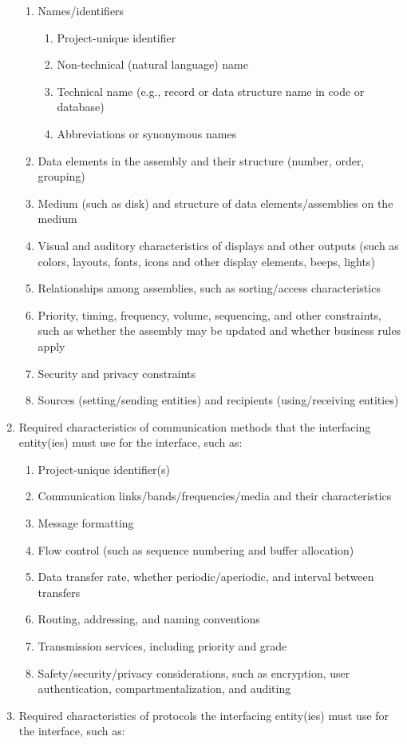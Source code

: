 \begin{enumerate}
  \begin{enumerate}
  \itemsep1pt\parskip0pt
  \item
    Names/identifiers

    \begin{enumerate}
    \itemsep1pt\parskip0pt
    \item
      Project-unique identifier
    \item
      Non-technical (natural language) name
    \item
      Technical name (e.g., record or data structure name in code or
      database)
    \item
      Abbreviations or synonymous names
    \end{enumerate}
  \item
    Data elements in the assembly and their structure (number, order,
    grouping)
  \item
    Medium (such as disk) and structure of data elements/assemblies on
    the medium
  \item
    Visual and auditory characteristics of displays and other outputs
    (such as colors, layouts, fonts, icons and other display elements,
    beeps, lights)
  \item
    Relationships among assemblies, such as sorting/access
    characteristics
  \item
    Priority, timing, frequency, volume, sequencing, and other
    constraints, such as whether the assembly may be updated and whether
    business rules apply
  \item
    Security and privacy constraints
  \item
    Sources (setting/sending entities) and recipients (using/receiving
    entities)
  \end{enumerate}
\item
  Required characteristics of communication methods that the interfacing
  entity(ies) must use for the interface, such as:

  \begin{enumerate}
  \itemsep1pt\parskip0pt
  \item
    Project-unique identifier(s)
  \item
    Communication links/bands/frequencies/media and their
    characteristics
  \item
    Message formatting
  \item
    Flow control (such as sequence numbering and buffer allocation)
  \item
    Data transfer rate, whether periodic/aperiodic, and interval between
    transfers
  \item
    Routing, addressing, and naming conventions
  \item
    Transmission services, including priority and grade
  \item
    Safety/security/privacy considerations, such as encryption, user
    authentication, compartmentalization, and auditing
  \end{enumerate}
\item
  Required characteristics of protocols the interfacing entity(ies) must
  use for the interface, such as:


\end{enumerate}

